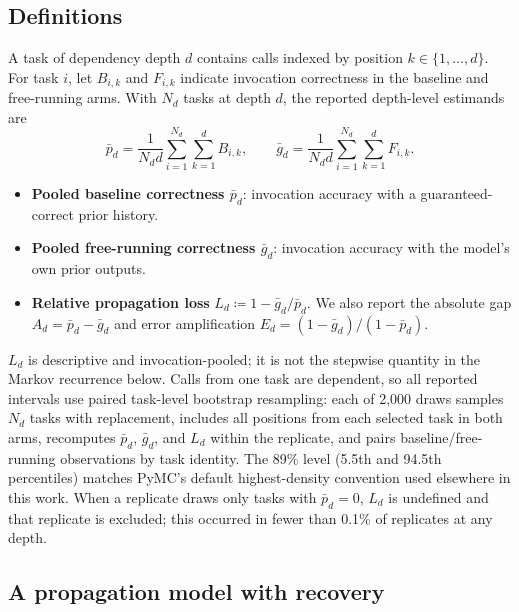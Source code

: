 \documentclass{article}
\begin{document}
\subsection{Definitions}
\label{sec:definitions}

A task of dependency depth $d$ contains calls indexed by position $k\in\{1,\ldots,d\}$. For task $i$, let $B_{i,k}$ and $F_{i,k}$ indicate invocation correctness in the baseline and free-running arms. With $N_d$ tasks at depth $d$, the reported depth-level estimands are
\begin{equation}
\bar p_d=\frac{1}{N_dd}\sum_{i=1}^{N_d}\sum_{k=1}^{d}B_{i,k},\qquad
\bar g_d=\frac{1}{N_dd}\sum_{i=1}^{N_d}\sum_{k=1}^{d}F_{i,k}.
\end{equation}

\begin{itemize}[leftmargin=*,itemsep=1pt,topsep=1pt,parsep=0pt]
  \item \textbf{Pooled baseline correctness $\bar p_d$}: invocation accuracy with a guaranteed-correct prior history.
  \item \textbf{Pooled free-running correctness $\bar g_d$}: invocation accuracy with the model's own prior outputs.
  \item \textbf{Relative propagation loss} $L_d \coloneqq 1-\bar g_d/\bar p_d$. We also report the absolute gap $A_d=\bar p_d-\bar g_d$ and error amplification $E_d=(1-\bar g_d)/(1-\bar p_d)$.
\end{itemize}

$L_d$ is descriptive and invocation-pooled; it is not the stepwise quantity in the Markov recurrence below. Calls from one task are dependent, so all reported intervals use paired task-level bootstrap resampling: each of 2{,}000 draws samples $N_d$ tasks with replacement, includes all positions from each selected task in both arms, recomputes $\bar p_d$, $\bar g_d$, and $L_d$ within the replicate, and pairs baseline/free-running observations by task identity. The 89\% level (5.5th and 94.5th percentiles) matches PyMC's default highest-density convention used elsewhere in this work. When a replicate draws only tasks with $\bar p_d=0$, $L_d$ is undefined and that replicate is excluded; this occurred in fewer than 0.1\% of replicates at any depth.

\subsection{A propagation model with recovery}
\label{sec:propagation-model}
\end{document}
